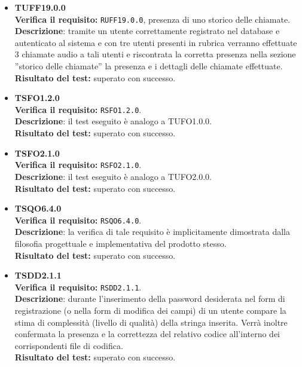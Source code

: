\begin{itemize}
\item \textbf{TUFF19.0.0}\\
\textbf{Verifica il requisito:} \texttt{RUFF19.0.0}, presenza di uno storico delle chiamate.\\
\textbf{Descrizione}: tramite un utente  correttamente registrato nel database e autenticato al sistema e con tre utenti presenti in rubrica verranno effettuate 3 chiamate audio a tali utenti e riscontrata la corretta presenza nella sezione ''storico delle chiamate'' la presenza e i dettagli delle chiamate effettuate.\\
\textbf{Risultato del test:} superato con successo.

\item \textbf{TSFO1.2.0}\\
\textbf{Verifica il requisito:} \texttt{RSFO1.2.0}.\\
\textbf{Descrizione}: il test eseguito è analogo a TUFO1.0.0.\\
\textbf{Risultato del test:} superato con successo.

\item \textbf{TSFO2.1.0}\\
\textbf{Verifica il requisito:} \texttt{RSFO2.1.0}.\\
\textbf{Descrizione}: il test eseguito è analogo a TUFO2.0.0.\\
\textbf{Risultato del test:} superato con successo.

\item \textbf{TSQO6.4.0}\\
\textbf{Verifica il requisito:} \texttt{RSQO6.4.0}.\\
\textbf{Descrizione}: la verifica di tale requisito è implicitamente dimostrata dalla filosofia progettuale e implementativa del prodotto stesso.\\
\textbf{Risultato del test:} superato con successo.

\item \textbf{TSDD2.1.1}\\
\textbf{Verifica il requisito:} \texttt{RSDD2.1.1}.\\
\textbf{Descrizione}: durante l'inserimento della password desiderata nel form di registrazione (o nella form di modifica dei campi) di un utente  compare la stima di complessità (livello di qualità) della stringa inserita. Verrà inoltre confermata la presenza e la correttezza  del relativo codice all'interno dei corrispondenti file di codifica.\\
\textbf{Risultato del test:} superato con successo.


\end{itemize}
